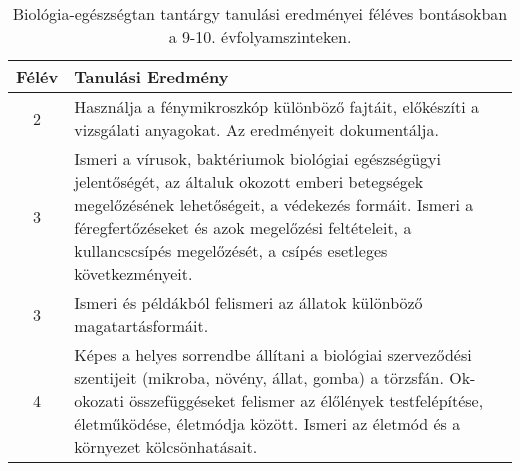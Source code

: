        
           \begin{longtable}{c | p{12cm} }
            \caption[Biológia-egészségtan 9-10.]{Biológia-egészségtan tantárgy tanulási eredményei féléves bontásokban a 9-10. évfolyamszinteken. }  \\

            \textbf{Félév} & \textbf{Tanulási Eredmény} \\
            \hline
            \endhead
                                
                                          2 &  Használja a fénymikroszkóp különböző fajtáit, előkészíti a vizsgálati anyagokat. Az eredményeit dokumentálja. \\ \hline
                                      
                                
                                          3 &  Ismeri a vírusok, baktériumok biológiai egészségügyi jelentőségét, az általuk okozott emberi betegségek megelőzésének lehetőségeit, a védekezés formáit. Ismeri a féregfertőzéseket és azok megelőzési feltételeit, a kullancscsípés megelőzését, a csípés esetleges következményeit. \\ \hline
                                          3 &  Ismeri és példákból felismeri az állatok különböző magatartásformáit. \\ \hline
                                      
                                
                                          4 &  Képes a helyes sorrendbe állítani a biológiai szerveződési szentijeit (mikroba, növény, állat, gomba) a törzsfán. Ok-okozati összefüggéseket felismer az élőlények testfelépítése, életműködése, életmódja között. Ismeri az életmód és a környezet kölcsönhatásait. \\ \hline
                                      
                        \end{longtable}
            \clearpage


